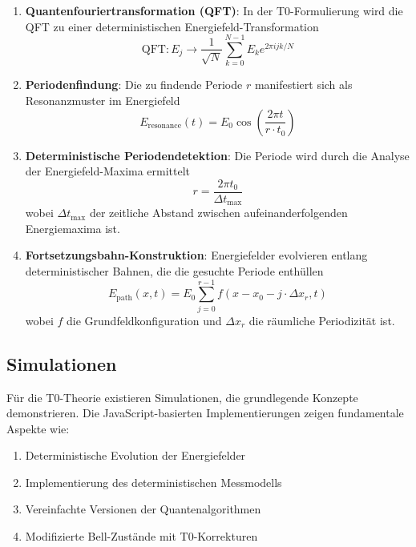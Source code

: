 \documentclass[12pt,a4paper]{article}
\theoremstyle{definition}
\begin{document}
	\begin{enumerate}
		\item \textbf{Quantenfouriertransformation (QFT)}: In der T0-Formulierung wird die QFT zu einer deterministischen Energiefeld-Transformation
		\begin{equation}
			\text{QFT}: E_j \rightarrow \frac{1}{\sqrt{N}} \sum_{k=0}^{N-1} E_k e^{2\pi i jk/N}
		\end{equation}
		
		\item \textbf{Periodenfindung}: Die zu findende Periode $r$ manifestiert sich als Resonanzmuster im Energiefeld
		\begin{equation}
			E_{\text{resonance}}(t) = E_0 \cos\left(\frac{2\pi t}{r \cdot t_0}\right)
		\end{equation}
		
		\item \textbf{Deterministische Periodendetektion}: Die Periode wird durch die Analyse der Energiefeld-Maxima ermittelt
		\begin{equation}
			r = \frac{2\pi t_0}{\Delta t_{\text{max}}}
		\end{equation}
		wobei $\Delta t_{\text{max}}$ der zeitliche Abstand zwischen aufeinanderfolgenden Energiemaxima ist.
		
		\item \textbf{Fortsetzungsbahn-Konstruktion}: Energiefelder evolvieren entlang deterministischer Bahnen, die die gesuchte Periode enthüllen
		\begin{equation}
			E_{\text{path}}(x,t) = E_0 \sum_{j=0}^{r-1} f(x - x_0 - j \cdot \Delta x_r, t)
		\end{equation}
		wobei $f$ die Grundfeldkonfiguration und $\Delta x_r$ die räumliche Periodizität ist.
	\end{enumerate}
	
	\subsection{Simulationen}
	
	Für die T0-Theorie existieren Simulationen, die grundlegende Konzepte demonstrieren. Die JavaScript-basierten Implementierungen zeigen fundamentale Aspekte wie:
	
	\begin{enumerate}
		\item Deterministische Evolution der Energiefelder
		\item Implementierung des deterministischen Messmodells
		\item Vereinfachte Versionen der Quantenalgorithmen
		\item Modifizierte Bell-Zustände mit T0-Korrekturen
	\end{enumerate}
	
\end{document}
